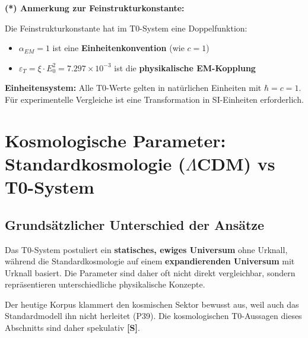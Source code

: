 \textbf{(*) Anmerkung zur Feinstrukturkonstante:}

Die Feinstrukturkonstante hat im T0-System eine Doppelfunktion:
\begin{itemize}
	\item $\alpha_{EM} = 1$ ist eine \textbf{Einheitenkonvention} (wie $c = 1$)
	\item $\varepsilon_T = \xi \cdot E_0^2 = 7.297 \times 10^{-3}$ ist die \textbf{physikalische EM-Kopplung}
\end{itemize}

\textbf{Einheitensystem:}
Alle T0-Werte gelten in natürlichen Einheiten mit $\hbar = c = 1$. Für experimentelle Vergleiche ist eine Transformation in SI-Einheiten erforderlich.

\section{Kosmologische Parameter: Standardkosmologie ($\Lambda$CDM) vs T0-System}
\label{sec:cosmic_t0_mapping}

\subsection{Grundsätzlicher Unterschied der Ansätze}
\label{subsec:paradigm_shift}

\begin{tcolorbox}[colback=red!5!white,colframe=red!75!black,title=Hinweis: Grundsätzliche Unterschiede]
	Das T0-System postuliert ein \textbf{statisches, ewiges Universum} ohne Urknall, während die Standardkosmologie auf einem \textbf{expandierenden Universum} mit Urknall basiert. Die Parameter sind daher oft nicht direkt vergleichbar, sondern repräsentieren unterschiedliche physikalische Konzepte.

	Der heutige Korpus klammert den kosmischen Sektor bewusst aus, weil auch das Standardmodell ihn nicht herleitet (P39). Die kosmologischen T0-Aussagen dieses Abschnitts sind daher spekulativ \textbf{[S]}.
\end{tcolorbox}

